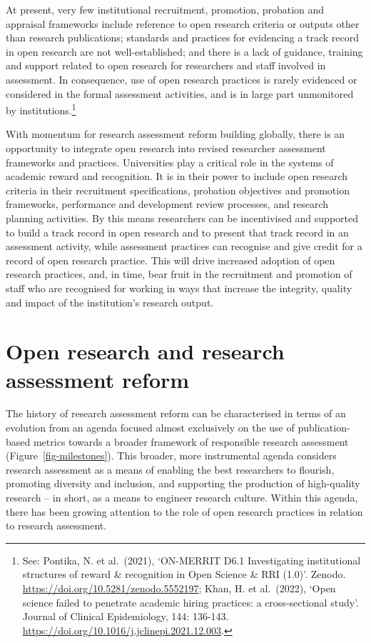 \documentclass[
  letterpaper,
  DIV=11,
  numbers=noendperiod,
  oneside]{scrreprt}
\begin{document}
At present, very few institutional recruitment, promotion, probation and
appraisal frameworks include reference to open research criteria or
outputs other than research publications; standards and practices for
evidencing a track record in open research are not well-established; and
there is a lack of guidance, training and support related to open
research for researchers and staff involved in assessment. In
consequence, use of open research practices is rarely evidenced or
considered in the formal assessment activities, and is in large part
unmonitored by institutions.\footnote{See: Pontika, N. et al.~(2021),
  `ON-MERRIT D6.1 Investigating institutional structures of reward \&
  recognition in Open Science \& RRI (1.0)'. Zenodo.
  \url{https://doi.org/10.5281/zenodo.5552197}; Khan, H. et al.~(2022),
  `Open science failed to penetrate academic hiring practices: a
  cross-sectional study'. Journal of Clinical Epidemiology, 144:
  136-143. \url{https://doi.org/10.1016/j.jclinepi.2021.12.003}.}

With momentum for research assessment reform building globally, there is
an opportunity to integrate open research into revised researcher
assessment frameworks and practices. Universities play a critical role
in the systems of academic reward and recognition. It is in their power
to include open research criteria in their recruitment specifications,
probation objectives and promotion frameworks, performance and
development review processes, and research planning activities. By this
means researchers can be incentivised and supported to build a track
record in open research and to present that track record in an
assessment activity, while assessment practices can recognise and give
credit for a record of open research practice. This will drive increased
adoption of open research practices, and, in time, bear fruit in the
recruitment and promotion of staff who are recognised for working in
ways that increase the integrity, quality and impact of the
institution's research output.

\section{Open research and research assessment
reform}\label{open-research-and-research-assessment-reform}

The history of research assessment reform can be characterised in terms
of an evolution from an agenda focused almost exclusively on the use of
publication-based metrics towards a broader framework of responsible
research assessment (Figure~\ref{fig-milestones}). This broader, more
instrumental agenda considers research assessment as a means of enabling
the best researchers to flourish, promoting diversity and inclusion, and
supporting the production of high-quality research -- in short, as a
means to engineer research culture. Within this agenda, there has been
growing attention to the role of open research practices in relation to
research assessment.
\end{document}
